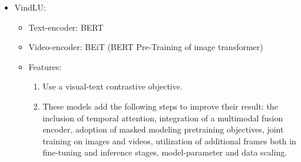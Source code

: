 \begin{itemize}
\item VindLU:
\begin{itemize}
\item Text-encoder: BERT
\item Video-encoder: BEiT (BERT Pre-Training of image transformer)
\item Features:
\begin{enumerate}
\item Use a visual-text contrastive objective.
\item These models add the following steps to improve their result: the inclusion of temporal attention, integration of a multimodal fusion encoder, adoption of masked modeling pretraining objectives, joint training on images and videos, utilization of additional frames both in fine-tuning and inference stages, model-parameter and data scaling.
\end{enumerate}
\end{itemize}
\end{itemize}